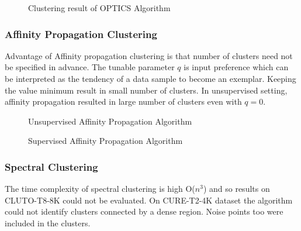 \begin{figure}[H]
\centering
\setlength{\lineskip}{\medskipamount}
\hfill
{}
\caption{Clustering result of OPTICS Algorithm} \label{fig:1}
\end{figure}





\subsubsection{Affinity Propagation Clustering}

Advantage of Affinity propagation clustering is that number of clusters need not be specified in advance. The tunable parameter $q$ is input preference which can be interpreted as the tendency of a data sample to become an exemplar. Keeping the value minimum result in small number of clusters. In unsupervised setting, affinity propagation resulted in large number of clusters even with $q=0$. 

\begin{figure}[H]
\centering
\setlength{\lineskip}{\medskipamount}
\hfill
{}
\caption{Unsupervised Affinity Propagation Algorithm} \label{fig:1}
\end{figure}


\begin{figure}[H]
\centering
\setlength{\lineskip}{\medskipamount}
\hfill
{}
\caption{Supervised Affinity Propagation Algorithm} \label{fig:1}
\end{figure}



 

\subsubsection{Spectral Clustering}

The time complexity of spectral clustering is high O($n^3$) and so results on CLUTO-T8-8K could not be evaluated. On CURE-T2-4K dataset the algorithm could not identify clusters connected by a dense region. Noise points too were included in the clusters.  



